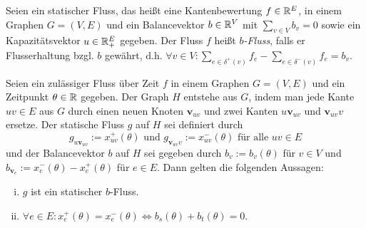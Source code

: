 
\begin{definition}
	Seien ein statischer Fluss, das heißt eine Kantenbewertung $f \in \mathbb{R}^E$, in einem Graphen $G=(V,E)$ und ein Balancevektor $b\in\mathbb{R}^V$ mit $\sum_{v\in V} b_v = 0$ sowie ein Kapazitätsvektor $u\in\mathbb{R}_+^E$ gegeben.
	Der Fluss $f$ heißt \emph{$b$-Fluss}, falls er Flusserhaltung bzgl. $b$ gewährt, d.h. $\forall v\in V: \sum_{e\in\delta^+(v)}f_e - \sum_{e\in\delta^-(v)}f_e = b_v$.
\end{definition}


\newcommand{\newv}{\mathbf{v}}
\begin{lemma}\label{lemma-b-graph}
	Seien ein zulässiger Fluss über Zeit $f$ in einem Graphen $G=(V,E)$ und ein Zeitpunkt $\theta\in\mathbb{R}$ gegeben.
	Der Graph $H$ entstehe aus $G$, indem man jede Kante $uv\in E$ aus $G$ durch einen neuen Knoten $\newv_{uv}$ und zwei Kanten $u\newv_{uv}$ und $\newv_{uv}v$ ersetze.
	Der statische Fluss $g$ auf $H$ sei definiert durch
	$$g_{u\newv_{uv}} := x_{uv}^+(\theta) \text{ und } g_{\newv_{uv}v} := x_{uv}^-(\theta) \text{ für alle $uv\in E$}$$
	und der Balancevektor $b$ auf $H$ sei gegeben durch $b_v:= b_v(\theta)$ für $v\in V$ und $b_{\newv_e}:= x_e^-(\theta) - x_e^+(\theta)$ für $e\in E$.
	Dann gelten die folgenden Aussagen:
	
	\begin{enumerate}[(i)]
		\item  $g$ ist ein statischer $b$-Fluss.
		\item\label{lemma-b-graph-imp} $\forall e\in E : x_e^+(\theta) = x_e^-(\theta)\iff b_s(\theta) + b_t(\theta) = 0$.
	\end{enumerate}
\end{lemma} 
